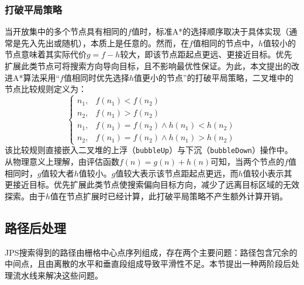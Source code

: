 \documentclass[lettersize,journal]{IEEEtran}
\begin{document}
\subsubsection{打破平局策略}
当开放集中的多个节点具有相同的$f$值时，标准A*的选择顺序取决于具体实现（通常是先入先出或随机），本质上是任意的。然而，在$f$值相同的节点中，$h$值较小的节点意味着其实际代价$g = f - h$较大，即该节点距起点更远、更接近目标。优先扩展此类节点可将搜索方向导向目标，且不影响最优性保证。为此，本文提出的改进A*算法采用``$f$值相同时优先选择$h$值更小的节点''的打破平局策略，二叉堆中的节点比较规则定义为：
\begin{equation}
\begin{cases}
n_1, & f(n_1) < f(n_2) \\
n_2, & f(n_1) > f(n_2) \\
n_1, & f(n_1) = f(n_2) \land h(n_1) < h(n_2) \\
n_2, & f(n_1) = f(n_2) \land h(n_1) > h(n_2)
\end{cases}
\label{eq:tbreak}
\end{equation}
该比较规则直接嵌入二叉堆的上浮（\texttt{bubbleUp}）与下沉（\texttt{bubbleDown}）操作中。
从物理意义上理解，由评估函数$f(n) = g(n) + h(n)$可知，当两个节点的$f$值相同时，$g$值较大者$h$值较小。$g$值较大表示该节点距起点更远，而$h$值较小表示其更接近目标。优先扩展此类节点使搜索偏向目标方向，减少了远离目标区域的无效探索。由于$h$值在节点扩展时已经计算，此打破平局策略不产生额外计算开销。
\subsection{路径后处理}
\label{subsec:post}
JPS搜索得到的路径由栅格中心点序列组成，存在两个主要问题：路径包含冗余的中间点，且由离散的水平和垂直段组成导致平滑性不足。本节提出一种两阶段后处理流水线来解决这些问题。
\end{document}
